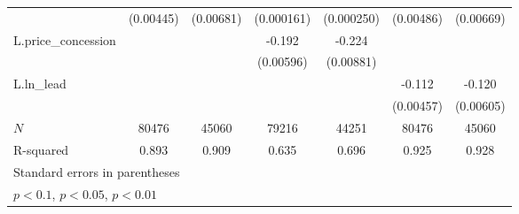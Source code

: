 {\begin{tabular}{l*{6}{c}}
            &   (0.00445)         &   (0.00681)         &  (0.000161)         &  (0.000250)         &   (0.00486)         &   (0.00669)         \\
\addlinespace
L.price\_concession&                     &                     &      -0.192\sym{***}&      -0.224\sym{***}&                     &                     \\
            &                     &                     &   (0.00596)         &   (0.00881)         &                     &                     \\
\addlinespace
L.ln\_lead   &                     &                     &                     &                     &      -0.112\sym{***}&      -0.120\sym{***}\\
            &                     &                     &                     &                     &   (0.00457)         &   (0.00605)         \\
\midrule
\(N\)       &       80476         &       45060         &       79216         &       44251         &       80476         &       45060         \\
R-squared   &       0.893         &       0.909         &       0.635         &       0.696         &       0.925         &       0.928         \\
\bottomrule
\multicolumn{7}{l}{\footnotesize Standard errors in parentheses}\\
\multicolumn{7}{l}{\footnotesize \sym{*} \(p<0.1\), \sym{**} \(p<0.05\), \sym{***} \(p<0.01\)}\\
\end{tabular}
}
